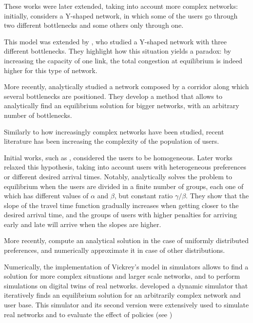 These works were later extended, taking into account more complex networks: initially, \textcite{doi:10.1287/trsc.24.3.217} considers a Y-shaped network,
in which some of the users go through two different bottlenecks and some others only through one.

This model was extended by \textcite{doi:10.1287/trsc.27.2.148},
who studied a Y-shaped network with three different bottlenecks.
They highlight how this situation yields a paradox:
by increasing the capacity of one link, the total congestion at equilibrium is indeed higher for this type of network.

More recently, \textcite{AKAMATSU2015808} analytically studied a network composed by a corridor along which several bottlenecks are positioned.
They develop a method that allows to analytically find an equilibrium solution for bigger networks,
with an arbitrary number of bottlenecks.

Similarly to how increasingly complex networks have been studied,
recent literature has been increasing the complexity of the population of users.

Initial works, such as \textcite{Vickrey1969}, considered the users to be homogeneous.
Later works relaxed this hypothesis, taking into account users with heterogeneous preferences or different desired arrival times.
Notably, \textcite{arnott1988schedule} analytically solves the problem to equilibrium when the users are divided in a finite number of groups,
each one of which has different values of \(\alpha\) and \(\beta\),
but constant ratio \(\gamma/\beta\).
They show that the slope of the travel time function gradually increases when getting closer to the desired arrival time,
and the groups of users with higher penalties for arriving early and late will arrive when the slopes are higher.

More recently, \textcite{amirgholy2017analytical} compute an analytical solution in the case of uniformly distributed preferences,
and numerically approximate it in case of other distributions.

Numerically, the implementation of Vickrey's model in simulators allows to find a solution for more complex situations and larger scale networks,
and to perform simulations on digital twins of real networks.
\textcite{de1997metropolis} developed a dynamic simulator that iteratively finds an equilibrium solution for an arbitrarily complex network and user base.
This simulator and its second version \parencite{RePEc:ema:worpap:2024-03}
were extensively used to simulate real networks and to evaluate the effect of policies (see \cite{de2002real,de2005congestion,de2006modelling})

